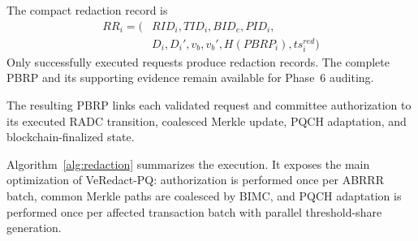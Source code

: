 \documentclass[lettersize,journal]{IEEEtran}
\begin{document}
    The compact redaction record is
    \begin{equation}
    \begin{aligned}
    RR_i=\big(
    &RID_i,TID_i,BID_e,PID_i,\\
    &D_i,D_i',v_b,v_b',
    H(PBRP_i),ts_i^{red}\big)
    \end{aligned}
    \end{equation}
    Only successfully executed requests
    produce redaction records. The complete
    PBRP and its supporting evidence remain
    available for Phase~6 auditing.
    
    The resulting PBRP links each validated
    request and committee authorization to
    its executed RADC transition, coalesced
    Merkle update, PQCH adaptation, and
    blockchain-finalized state.
    
    
    Algorithm~\ref{alg:redaction} summarizes the execution. It exposes the
    main optimization of VeRedact-PQ: authorization is performed once per
    ABRRR batch, common Merkle paths are coalesced by BIMC, and PQCH
    adaptation is performed once per affected transaction batch with
    parallel threshold-share generation.
    
\end{document}
